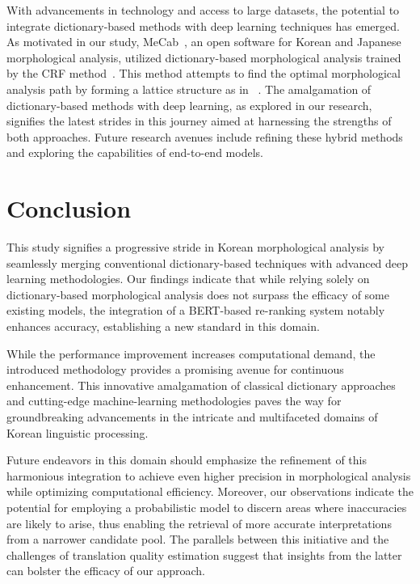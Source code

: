 \documentclass[AMS,STIX2COL]{WileyNJD-v2}
\begin{document}
    With advancements in technology and access to large datasets, the potential to integrate dictionary-based methods with deep learning techniques has emerged.
    As motivated in our study, MeCab~\cite{MeCab}, an open software for Korean and Japanese morphological analysis, utilized dictionary-based morphological analysis trained by the CRF method~\cite{Lafferty2001}.
    This method attempts to find the optimal morphological analysis path by forming a lattice structure as in ~\cite{Kudo2004, NaSH2014, NaSH2015, NaSH2018}.
    The amalgamation of dictionary-based methods with deep learning, as explored in our research, signifies the latest strides in this journey aimed at harnessing the strengths of both approaches.
    Future research avenues include refining these hybrid methods and exploring the capabilities of end-to-end models.


    \section{Conclusion}\label{sec:conclusion}

    This study signifies a progressive stride in Korean morphological analysis by seamlessly merging conventional dictionary-based techniques with advanced deep learning methodologies.
    Our findings indicate that while relying solely on dictionary-based morphological analysis does not surpass the efficacy of some existing models, the integration of a BERT-based re-ranking system notably enhances accuracy, establishing a new standard in this domain.

    While the performance improvement increases computational demand, the introduced methodology provides a promising avenue for continuous enhancement.
    This innovative amalgamation of classical dictionary approaches and cutting-edge machine-learning methodologies paves the way for groundbreaking advancements in the intricate and multifaceted domains of Korean linguistic processing.

    Future endeavors in this domain should emphasize the refinement of this harmonious integration to achieve even higher precision in morphological analysis while optimizing computational efficiency.
    Moreover, our observations indicate the potential for employing a probabilistic model to discern areas where inaccuracies are likely to arise, thus enabling the retrieval of more accurate interpretations from a narrower candidate pool.
    The parallels between this initiative and the challenges of translation quality estimation suggest that insights from the latter can bolster the efficacy of our approach.


    
\end{document}
